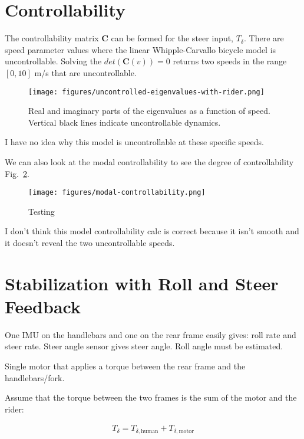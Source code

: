 \documentclass[12pt]{article}
\begin{document}
\section{Controllability}

The controllability matrix \(\mathbf{C}\) can be formed for the steer input,
\(T_\delta\). There are speed parameter values where the linear
Whipple-Carvallo bicycle model is uncontrollable. Solving the
\(det(\mathbf{C}(v))=0\) returns two speeds in the range \([0, 10]\) m/s that
are uncontrollable.

\begin{figure}
  \centering
  \texttt{[image: figures/uncontrolled-eigenvalues-with-rider.png]}
  \caption{Real and imaginary parts of the eigenvalues as a function of speed.
  Vertical black lines indicate uncontrollable dynamics.}
  \label{fig:uncontrolled-eigenvalues-with-rider}
\end{figure}

I have no idea why this model is uncontrollable at these specific speeds.

We can also look at the modal controllability to see the degree of
controllability Fig.~\ref{fig:modal-controllability}.

\begin{figure}
  \centering
  \texttt{[image: figures/modal-controllability.png]}
  \caption{Testing}
  \label{fig:modal-controllability}
\end{figure}

I don't think this model controllability calc is correct because it isn't
smooth and it doesn't reveal the two uncontrollable speeds.

\section{Stabilization with Roll and Steer Feedback}

One IMU on the handlebars and one on the rear frame easily gives: roll rate and
steer rate. Steer angle sensor gives steer angle. Roll angle must be estimated.

Single motor that applies a torque between the rear frame and the
handlebars/fork.

Assume that the torque between the two frames is the sum of the motor and the
rider:

\begin{align}
  T_\delta = T_{\delta,\textrm{human}} + T_{\delta,\textrm{motor}}
\end{align}
\end{document}
